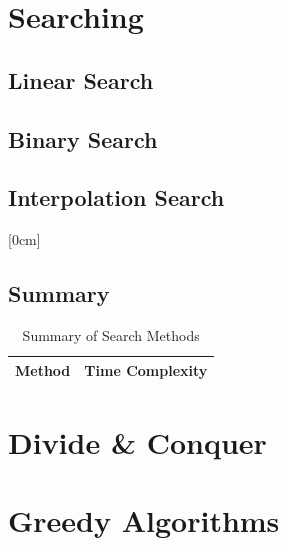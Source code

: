 \documentclass[a4paper,oneside]{book}
\begin{document}
\chapter{Searching}
\section{Linear Search}
\section{Binary Search}
\section{Interpolation Search \cite{interpolsearch}}
[0cm]
\section{Summary}
\begin{table}[H]
\begin{tabular}{|l |l |}
\hline
\textbf{Method} & \textbf{Time Complexity} \\ \hline
\end{tabular}
\caption{Summary of Search Methods}
\label{tab:algo_search}
\end{table}
\chapter{Divide \& Conquer}
\chapter{Greedy Algorithms}
\end{document}

